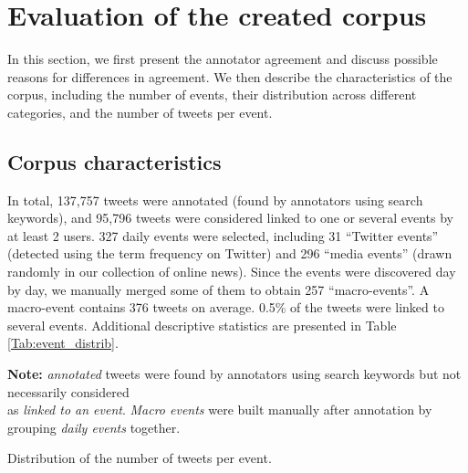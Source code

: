 \section{Evaluation of the created corpus}
\label{Evaluation of the created corpus}

In this section, we first present the annotator agreement and discuss possible reasons for differences in agreement. We then describe  the characteristics of the corpus, including the number of events, their distribution across different categories, and the number of tweets per event. 


	\subsection{Corpus characteristics}
In total, 137,757 tweets were annotated (found by
annotators using search keywords), and 95,796 tweets
were considered linked to one or several events by at least 2 users. 327
daily events were selected, including 31 “Twitter events”
(detected using the term frequency on Twitter) and 296
“media events” (drawn randomly in our collection of
online news). Since the events were discovered day by day, we
manually merged some of them to obtain 257 “macro-events”. A macro-event contains 376 tweets on average. 0.5\%
of the tweets were linked to several events. Additional
descriptive statistics are presented in Table \ref{Tab:event_distrib}.

\begin{table}
\begin{center}
\makebox[\textwidth][c]{}
{\scriptsize \textbf{Note:} \textit{annotated} tweets were found by annotators using search
keywords but not necessarily considered \\as \textit{linked to an event}. \textit{Macro events} were built manually after annotation by grouping \textit{daily events} together.}
\end{center}
\caption{Distribution of the number of tweets per event. \label{Tab:event_distrib}}
\end{table}



%
%

